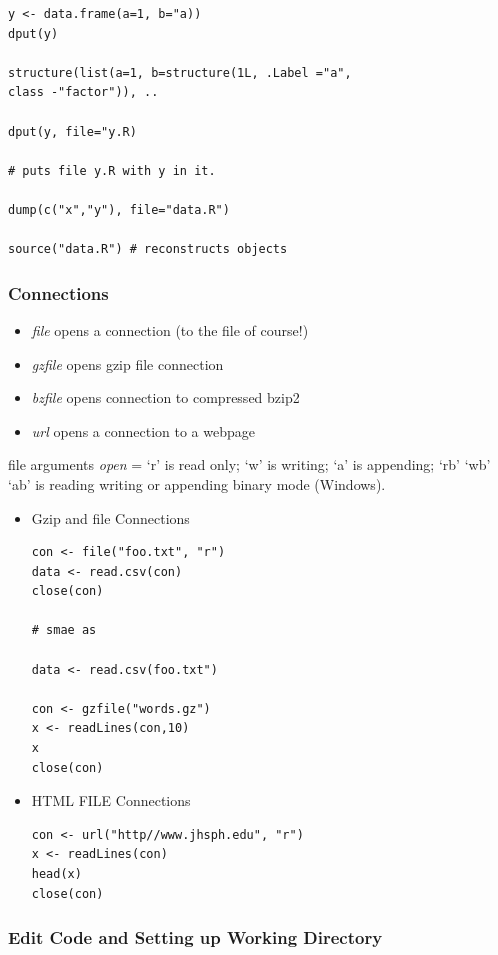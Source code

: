 \documentclass[11pt]{article}
\begin{document}
\begin{verbatim}
y <- data.frame(a=1, b="a))
dput(y)

structure(list(a=1, b=structure(1L, .Label ="a",
class -"factor")), ..

dput(y, file="y.R)

# puts file y.R with y in it.

dump(c("x","y"), file="data.R")

source("data.R") # reconstructs objects
\end{verbatim}
\subsubsection{Connections}
\label{sec-1-7-6}

\begin{itemize}
\item \emph{file} opens a connection (to the file of course!)
\item \emph{gzfile} opens gzip file connection
\item \emph{bzfile} opens connection to compressed bzip2
\item \emph{url} opens a connection to a webpage
\end{itemize}

file arguments \emph{open} = `r' is read only; `w' is writing;
`a' is appending; `rb' `wb' `ab' is reading writing or appending
binary  mode (Windows).
\begin{itemize}

\item Gzip and file Connections\\
\label{sec-1-7-6-1}%
\begin{verbatim}
con <- file("foo.txt", "r")
data <- read.csv(con)
close(con)

# smae as

data <- read.csv(foo.txt")

con <- gzfile("words.gz")
x <- readLines(con,10)
x
close(con)
\end{verbatim}

\item HTML FILE Connections\\
\label{sec-1-7-6-2}%
\begin{verbatim}
con <- url("http//www.jhsph.edu", "r")
x <- readLines(con)
head(x)
close(con)
\end{verbatim}

\end{itemize} %
\subsubsection{Edit Code and Setting up Working Directory}
\label{sec-1-7-7}
\end{document}
